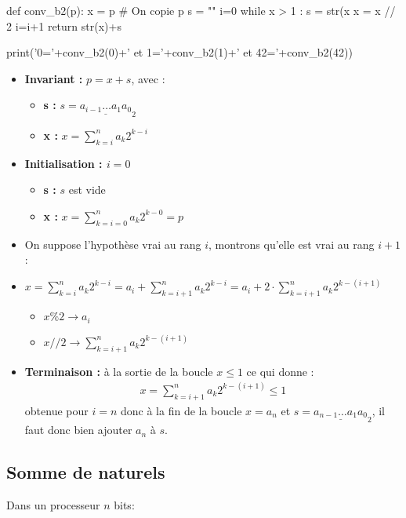 \begin{pycode}
def conv_b2(p):
    x = p # On copie p
    s = ""
    i=0
    while x > 1 : 
        s = str(x%
        x = x // 2
        i=i+1
    return str(x)+s

print('0='+conv_b2(0)+' et 1='+conv_b2(1)+' et 42='+conv_b2(42))
\end{pycode}
\begin{itemize}
\item \textbf{Invariant : } $p=x+s$, avec : 
\begin{itemize}
\item \textbf{s : } $s=\underline{a_{i-1}\dots a_1a_0}_2$
\item \textbf{x : } $x=\displaystyle{\sum_{k=i}^n a_k2^{k-i}}$
\end{itemize}
\item \textbf{Initialisation : $i=0$}
\begin{itemize}
\item \textbf{s : } $s$ est vide
\item \textbf{x : } $x=\displaystyle{\sum_{k=i=0}^n a_k2^{k-0}=p}$
\end{itemize}
\item On suppose l'hypothèse vrai au rang $i$, montrons qu'elle est vrai au rang $i+1$ : 
\item $x=\displaystyle{\sum_{k=i}^n a_k2^{k-i}=a_i+\sum_{k=i+1}^n a_k2^{k-i}=a_i+2\cdot \sum_{k=i+1}^n a_k2^{k-(i+1)}}$
\begin{itemize}
\item $x\%2\rightarrow a_i$
\item $x//2\rightarrow \displaystyle{\sum_{k=i+1}^n a_k2^{k-(i+1)}}$
\end{itemize}
\item \textbf{Terminaison : }
à la sortie de la boucle $x\leq 1$ ce qui donne :
\begin{align*}
x=\displaystyle{\sum_{k=i+1}^n a_k2^{k-(i+1)}}\leq 1
\end{align*}
obtenue pour $i=n$ donc à la fin de la boucle $x=a_n$ et $s=\underline{a_{n-1}\dots a_1a_0}_2$, il faut donc bien ajouter $a_n$ à $s$.
\end{itemize}

\subsection{Somme de naturels}
\sloppy

Dans un processeur $n$ bits:

